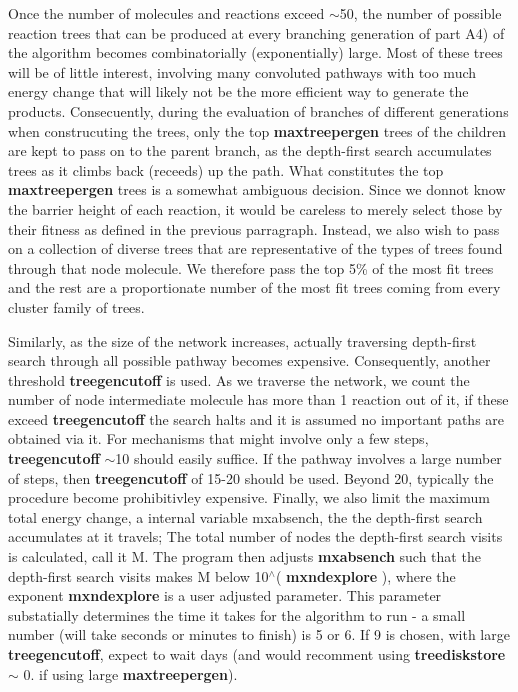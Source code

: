 Once the number of molecules and reactions exceed $\sim$50, the number of possible reaction trees that can be produced at every branching generation of part A4) of the algorithm becomes combinatorially (exponentially) large. Most of these trees will be of little interest, involving many convoluted pathways with too much energy change that will likely not be the more efficient way to generate the products. Consecuently, during the evaluation of branches of different generations when construcuting the trees, only the top {\bfseries maxtreepergen} trees of the children are kept to pass on to the parent branch, as the depth-\/first search accumulates trees as it climbs back (receeds) up the path. What constitutes the top {\bfseries maxtreepergen} trees is a somewhat ambiguous decision. Since we donnot know the barrier height of each reaction, it would be careless to merely select those by their fitness as defined in the previous parragraph. Instead, we also wish to pass on a collection of \textquotesingle{}diverse\textquotesingle{} trees that are representative of the types of trees found through that node molecule. We therefore pass the top 5\% of the most fit trees and the rest are a proportionate number of the most fit trees coming from every cluster family of trees.

Similarly, as the size of the network increases, actually traversing depth-\/first search through all possible pathway becomes expensive. Consequently, another threshold {\bfseries treegencutoff} is used. As we traverse the network, we count the number of node intermediate molecule has more than 1 reaction out of it, if these exceed {\bfseries treegencutoff} the search halts and it is assumed no important paths are obtained via it. For mechanisms that might involve only a few steps, {\bfseries treegencutoff} $\sim$10 should easily suffice. If the pathway involves a large number of steps, then {\bfseries treegencutoff} of 15-\/20 should be used. Beyond 20, typically the procedure become prohibitivley expensive. Finally, we also limit the maximum total energy change, a internal variable mxabsench, the the depth-\/first search accumulates at it travels; The total number of nodes the depth-\/first search visits is calculated, call it M. The program then adjusts {\bfseries mxabsench} such that the depth-\/first search visits makes M below 10$^\wedge$( {\bfseries mxndexplore} ), where the exponent {\bfseries mxndexplore} is a user adjusted parameter. This parameter substatially determines the time it takes for the algorithm to run -\/ a small number (will take seconds or minutes to finish) is 5 or 6. If 9 is chosen, with large {\bfseries treegencutoff}, expect to wait days (and would recomment using {\bfseries treediskstore} $\sim$ 0. if using large {\bfseries maxtreepergen}).

